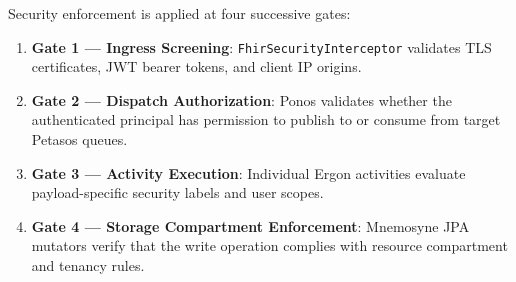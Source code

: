 Security enforcement is applied at four successive gates:
\begin{enumerate}
    \item \textbf{Gate 1 --- Ingress Screening}: \texttt{FhirSecurityInterceptor} validates TLS certificates, JWT bearer tokens, and client IP origins.
    \item \textbf{Gate 2 --- Dispatch Authorization}: Ponos validates whether the authenticated principal has permission to publish to or consume from target Petasos queues.
    \item \textbf{Gate 3 --- Activity Execution}: Individual Ergon activities evaluate payload-specific security labels and user scopes.
    \item \textbf{Gate 4 --- Storage Compartment Enforcement}: Mnemosyne JPA mutators verify that the write operation complies with resource compartment and tenancy rules.
\end{enumerate}

\newpage
